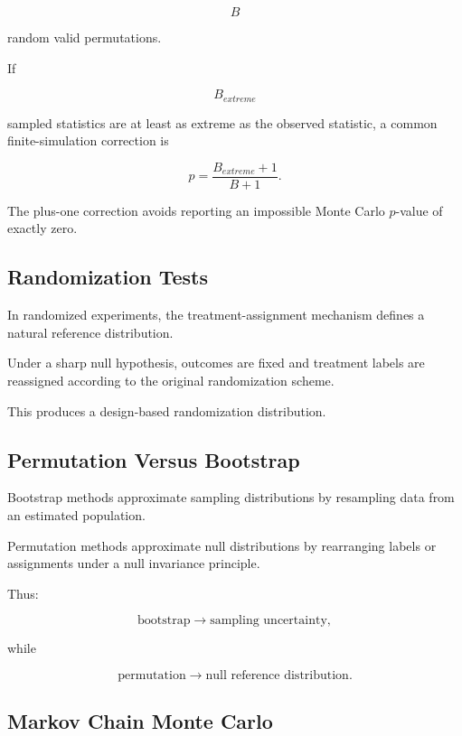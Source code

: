 \[
B
\]

random valid permutations.

If

\[
B_{extreme}
\]

sampled statistics are at least as extreme as the observed statistic, a
common finite-simulation correction is

\[
\boxed{
p
=
\frac{
B_{extreme}+1
}{
B+1
}.
}
\]

The plus-one correction avoids reporting an impossible Monte Carlo
\(p\)-value of exactly zero.

\subsection{Randomization Tests}
\label{subsec:randomization-tests-computational}

In randomized experiments, the treatment-assignment mechanism defines a
natural reference distribution.

Under a sharp null hypothesis, outcomes are fixed and treatment labels
are reassigned according to the original randomization scheme.

This produces a design-based randomization distribution.

\subsection{Permutation Versus Bootstrap}
\label{subsec:permutation-versus-bootstrap}

Bootstrap methods approximate sampling distributions by resampling data
from an estimated population.

Permutation methods approximate null distributions by rearranging labels
or assignments under a null invariance principle.

Thus:

\[
\boxed{
\text{bootstrap}
\rightarrow
\text{sampling uncertainty},
}
\]

while

\[
\boxed{
\text{permutation}
\rightarrow
\text{null reference distribution}.
}
\]

\subsection{Markov Chain Monte Carlo}
\label{subsec:mcmc-computational-statistics}

